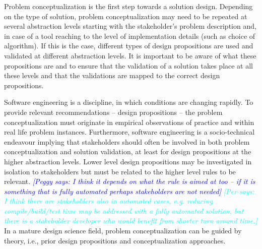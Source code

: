\documentclass[graybox]{svmult}
\newcommand{\peggy}[1]{\textcolor{blue}{{\it [Peggy says: #1]}}}
\newcommand{\per}[1]{\textcolor{cyan}{{\it [Per says: #1]}}}
\newcommand{\peggy}[1]{}
\newcommand{\per}[1]{}
\begin{document}
Problem conceptualization is the first step towards a solution design. Depending on the type of solution, problem conceptualization may need to be repeated at several abstraction levels starting with the stakeholder's problem description and, in case of a tool reaching to the level of implementation details (such as  choice of algorithm). If this is the case, different types of design propositions are used and validated at different abstraction levels. It is important to be aware of what these propositions are and to ensure that the validation of a solution takes place at all these levels and that the validations are mapped to the correct design propositions. 

Software engineering is a discipline, in which conditions are changing rapidly. To provide relevant recommendations -- design propositions --  the problem conceptualization must originate in empirical observations of practice and within real life problem instances. Furthermore, software engineering is a socio-technical endeavour implying that stakeholders should often be involved in both problem conceptualization and solution validation, at least for design propositions at the higher abstraction levels. Lower level design propositions may be investigated in isolation to stakeholders but must be related to the higher level rules to be relevant. 
\peggy{I think it depends on what the rule is aimed at too -- if it is something that is fully automated perhaps stakeholders are not needed} \per{I think there are stakeholders also in automated cases, e.g. reducing compile/build/test time may be addressed with a fully automated solution, but there is a stakeholder developer who would benefit from shorter turn around time.}
In a mature design science field, problem conceptualization can be guided by theory, i.e., prior design propositions and conceptualization approaches. 





\end{document}
